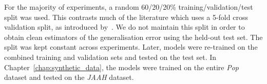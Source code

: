 For the majority of experiments, a random 60/20/20\% training/validation/test split was used. This contrasts much of the literature which uses a 5-fold cross validation split, as introduced by~\citet{FourTimelyInsights}. We do not maintain this split in order to obtain clean estimators of the generalisation error using the held-out test set. The split was kept constant across experiments. Later, models were re-trained on the combined training and validation sets and tested on the test set. In Chapter~\ref{chap:synthetic_data}, the models were trained on the entire \emph{Pop} dataset and tested on the \emph{JAAH} dataset.